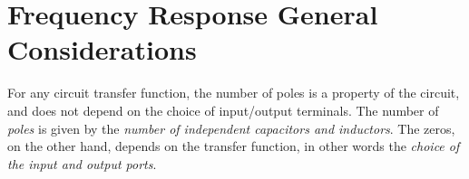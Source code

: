 \section{Frequency Response General Considerations}
For any circuit transfer function, the number of poles is a property of the circuit, and does not depend on the choice of input/output terminals.  The number of \textit{poles} is given by the \textit{number of independent capacitors and inductors}.  The zeros, on the other hand, depends on the transfer function, in other words the \textit{choice of the input and output ports}.

